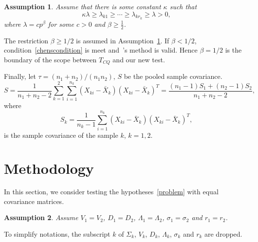 \documentclass[review]{elsarticle}
\theoremstyle{plain}
\newtheorem{assumption}{\quad\quad Assumption}
\theoremstyle{definition}
\theoremstyle{remark}
\begin{document}
\begin{assumption}\label{orderOfBeta}
    Assume that there is some constant $\kappa$ such that
    \begin{equation*}
    \kappa \lambda\geq \lambda_{k1}\geq \cdots \geq\lambda_{kr_k}\geq \lambda>0,
\end{equation*}
    where $\lambda=cp^\beta$ for some $c>0$ and $\beta\geq \frac{1}{2}$.
\end{assumption}


The restriction $\beta\geq 1/2$ is assumed in Assumption~\ref{orderOfBeta}. If $\beta< 1/2$, condition~\eqref{chenscondition} is meet and~\cite{Chen2010A}'s  method is valid. 
 Hence $\beta=1/2$ is the boundary of the scope between $T_{CQ}$ and our new test.


Finally, let $\tau={(n_1+n_2)}/{(n_1n_2)}$, $S$ be the pooled sample covariance.
\begin{equation}
S=\frac{1}{n_1+n_2-2}\sum_{k=1}^2\sum_{i=1}^{n_k} (X_{ki}-\bar{X}_k) {(X_{ki}-\bar{X}_k)}^T
    =\frac{(n_1-1)S_1+(n_2-1)S_2}{n_1+n_2-2},
\end{equation}
where
\begin{equation}
S_k=\frac{1}{n_k -1}\sum_{i=1}^{n_k} (X_{ki}-\bar{X}_k) {(X_{ki}-\bar{X}_k)}^T,
\end{equation}
is the sample covariance  of the sample $k$, $k=1,2$.


\section{Methodology}

In this section, we consider testing the hypotheses~\eqref{problem} with equal covariance matrices.
\begin{assumption}\label{theModel2}
Assume $V_1=V_2$, $D_1=D_2$, $\Lambda_1=\Lambda_2$, $\sigma_1=\sigma_2$ and $r_1=r_2$.
\end{assumption}

To simplify notations, the subscript $k$ of $\Sigma_k$, $V_k$, $D_k$, $\Lambda_k$, $\sigma_k$ and $r_k$ are dropped.
\end{document}
